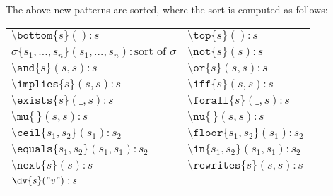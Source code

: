 \documentclass{article}
\theoremstyle{plain}
\theoremstyle{definition}
\begin{document}
\begin{enumerate}
The above new patterns are sorted, where the sort is computed as follows:
\begin{center}    
\begin{tabular}{ll}
$\texttt{\textbackslash{}bottom}\{s\}():s$ & $\texttt{\textbackslash{}top}\{s\}():s$\\
$\sigma \{s_1,\ldots, s_n\}(s_1,\ldots,s_n): \textrm{sort of }\sigma$\qquad{} & $\texttt{\textbackslash{}not}\{s\}(s) :s$ \\
$\texttt{\textbackslash{}and}\{s\}(s, s):s$ & $\texttt{\textbackslash{}or}\{s\}(s, s):s$\\
$\texttt{\textbackslash{}implies}\{s\}(s, s):s$ & $\texttt{\textbackslash{}iff}\{s\}(s, s):s$\\
$\texttt{\textbackslash{}exists}\{s\}(\_, s):s$ & $\texttt{\textbackslash{}forall}\{s\}(\_, s):s$\\
$\texttt{\textbackslash{}mu}\{\,\}(s, s):s$ & $\texttt{\textbackslash{}nu}\{\,\}(s, s):s$\\
$\texttt{\textbackslash{}ceil}\{s_1, s_2\}(s_1):s_2$ & $\texttt{\textbackslash{}floor}\{s_1, s_2\}(s_1):s_2$\\
$\texttt{\textbackslash{}equals}\{s_1, s_2\}(s_1, s_1):s_2$ & $\texttt{\textbackslash{}in}\{s_1, s_2\}(s_1, s_1):s_2$\\
$\texttt{\textbackslash{}next}\{s\}(s):s$ & $\texttt{\textbackslash{}rewrites}\{s\}(s, s):s$\\
$\texttt{\textbackslash{}dv}\{s\}("v"):s$
\end{tabular}
\end{center}


\end{enumerate}
\end{document}
